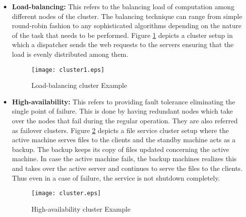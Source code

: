 \begin{itemize}
  \item \textbf{Load-balancing:} This refers to the balancing load of computation among different nodes of the cluster. The balancing technique can range from simple round-robin fashion to any sophisticated algorithms depending on the nature of the task that needs to be performed. Figure \ref{figures:cluster1} depicts a cluster setup in which a dispatcher sends the web requests to the servers ensuring that the load is evenly distributed among them.
  
    \makeatletter
    \setlength{\intextsep}{25pt}
    \makeatother

    \begin{figure}[h!]
    \centering
    \texttt{[image: cluster1.eps]}
    \caption{Load-balancing cluster Example}\label{figures:cluster1}
    \end{figure}

  \item \textbf{High-availability:} This refers to providing fault tolerance eliminating the single point of failure. This is done by having redundant nodes which take over the nodes that fail during the regular operation. They are also referred as failover clusters. Figure \ref{figures:cluster} depicts a file service cluster setup where the active machine serves files to the clients and the standby machine acts as a backup. The backup keeps its copy of files updated concerning the active machine. In case the active machine fails, the backup machines realizes this and takes over the active server and continues to serve the files to the clients. Thus even in a case of failure, the service is not shutdown completely.

    \makeatletter
    \setlength{\intextsep}{25pt}
    \makeatother

    \begin{figure}[h]
    \centering
    \texttt{[image: cluster.eps]}
    \caption{High-availability cluster Example}\label{figures:cluster}
    \end{figure}

\end{itemize} 

